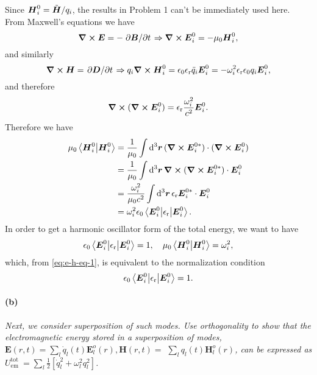 \documentclass[hyperref, a4paper]{article}
\newcommand{\epsr}{\epsilon_{\text{r}}}
\newcommand*{\mvb}[1]{\tilde{\vb*{#1}}}
\begin{document}
Since $\vb*{H}_i^0 = \mvb{H} / q_i$, the results in Problem 1 can't be immediately used here. 
From Maxwell's equations we have 
\[
    \curl{\vb*{E}} = - \pdv*{\vb*{B}}{t} \Rightarrow 
    \curl{\vb*{E}_i^0} = - \mu_0 \vb*{H}_i^0, 
\]
and similarly 
\[
    \curl{\vb*{H}} = \pdv*{\vb*{D}}{t} \Rightarrow
    q_i \curl{\vb*{H}_i^0} = \epsilon_0 \epsr \ddot{q}_i \vb*{E}_i^0 
    = - \omega_i^2 \epsr \epsilon_0 q_i \vb*{E}_i^0,
\]
and therefore 
\[
    \curl{(\curl{\vb*{E}_i^0})} = \epsr \frac{\omega_i^2}{c^2} \vb*{E}_i^0.
\]
Therefore we have 
\begin{equation}
    \begin{aligned}
        \mu_0 \braket{\vb*{H}_i^0}{\vb*{H}_i^0} 
        &= \frac{1}{\mu_0} \int \dd[3]{\vb*{r}} (\curl{\vb*{E}_i^{0*}}) \cdot (\curl{\vb*{E}_i^0}) \\
        &= \frac{1}{\mu_0} \int \dd[3]{\vb*{r}} \curl{(\curl{\vb*{E}_i^{0*}})} \cdot \vb*{E}_i^0 \\
        &= \frac{\omega_i^2}{\mu_0 c^2} \int \dd[3]{\vb*{r}} \epsr \vb*{E}_i^{0*} \cdot \vb*{E}_i^0 \\
        &= \omega_i^2 \epsilon_0 \mel**{\vb*{E}_i^0}{\epsr}{\vb*{E}_i^0}.
    \end{aligned}
    \label{eq:e-h-eq-1}
\end{equation}
In order to get a harmonic oscillator form of the total energy, 
we want to have 
\begin{equation}
    \epsilon_0 \mel**{\vb*{E}_i^0}{\epsr}{\vb*{E}_i^0} = 1, \quad 
    \mu_0 \braket{\vb*{H}_i^0}{\vb*{H}_i^0} = \omega_i^2, 
\end{equation}
which, from \eqref{eq:e-h-eq-1}, is equivalent to the normalization condition 
\begin{equation}
    \epsilon_0 \mel**{\vb*{E}_i^0}{\epsr}{\vb*{E}_i^0} = 1.
    \label{eq:e-normalize-epsilon}
\end{equation} 

\paragraph*{(b)} \textit{Next, we consider superposition of such modes. Use orthogonality to show that the electromagnetic energy stored in a superposition of modes, $\mathbf{E}(r, t)=\sum_l \dot{q}_l(t) \mathbf{E}_l^o(r), \mathbf{H}(r, t)=$ $\sum_l q_l(t) \mathbf{H}_l^o(r)$, can be expressed as $U_{\text {em }}^{\text {tot }}=\sum_l \frac{1}{2}\left[\dot{q}_l^2+\omega_l^2 q_l^2\right]$.}
\end{document}
